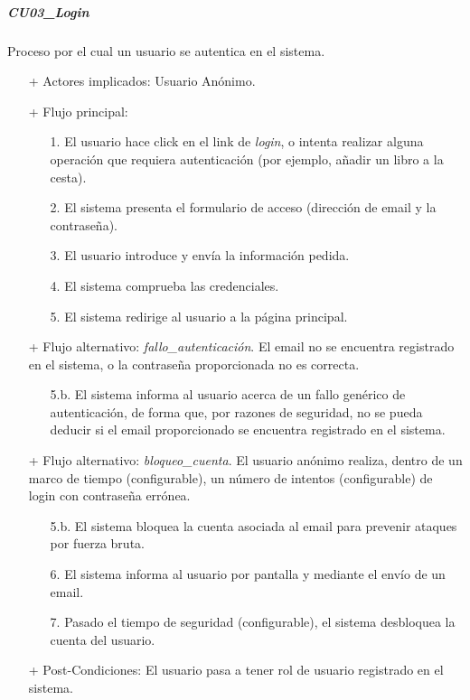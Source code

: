 \documentclass[a4paper]{article}
\begin{document}
            \subparagraph{CU03\_Login}
                Proceso por el cual un usuario se autentica en el sistema.
                \begin{itemize}
                    \item[+] Actores implicados: Usuario Anónimo.
                    \item[+] Flujo principal:
                    \begin{enumerate}
                        \item[1.] El usuario hace click en el link de \emph{login}, o intenta realizar alguna operación que requiera autenticación (por ejemplo, añadir un libro a la cesta).
                        \item[2.] El sistema presenta el formulario de acceso (dirección de email y la contraseña).
                        \item[3.] El usuario introduce y envía la información pedida.
                        \item[4.] El sistema comprueba las credenciales.
                        \item[5.] El sistema redirige al usuario a la página principal.
                    \end{enumerate}
                    \item[+] Flujo alternativo: \emph{fallo\_autenticación}. El email no se encuentra registrado en el sistema, o la contraseña proporcionada no es correcta.
                    \begin{itemize}
                        \item[5.b.] El sistema informa al usuario acerca de un fallo genérico de autenticación, de forma que, por razones de seguridad, no se pueda deducir si el email proporcionado se encuentra registrado en el sistema.
                    \end{itemize}
                    \item[+] Flujo alternativo: \emph{bloqueo\_cuenta}. El usuario anónimo realiza, dentro de un marco de tiempo (configurable), un número de intentos (configurable) de login con contraseña errónea.
                    \begin{itemize}
                        \item[5.b.] El sistema bloquea la cuenta asociada al email para prevenir ataques por fuerza bruta.
                        \item[6.] El sistema informa al usuario por pantalla y mediante el envío de un email.
                        \item[7.] Pasado el tiempo de seguridad (configurable), el sistema desbloquea la cuenta del usuario.
                    \end{itemize}
                    \item[+] Post-Condiciones: El usuario pasa a tener rol de usuario registrado en el sistema.
                \end{itemize}
\end{document}
